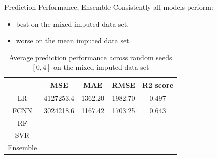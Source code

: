 \documentclass{beamer} %
\begin{document}
\begin{frame}{Prediction Performance, Ensemble}
\vspace{-1cm}
 Consistently all models perform:
  \begin{itemize}
      \item best on the mixed imputed data set,
      \item worse on the mean imputed data set.
  \end{itemize}
  \begin{table}[ht!]
    \hspace{-0.7cm}
    \begin{tabular}{|c|c|c|c|c|}
        \hline
        & MSE & MAE & RMSE & R2 score\\
        \hline
        LR & 4127253.4 & 1362.20 & 1982.70 & 0.497 \\
        FCNN & 3024218.6 & 1167.42 & 1703.25 & 0.643 \\
        RF &  &  &  &  \\
        SVR &  &  &  &  \\
        Ensemble &  &  &  &  \\
        \hline
    \end{tabular}
    \caption{Average prediction performance across random seeds $[0, 4]$ on the mixed imputed data set}
    \label{tab:pred_perf}
\end{table}
\end{frame}
\end{document}
